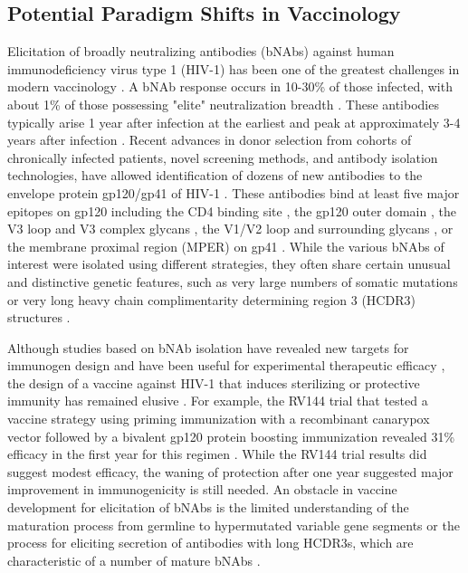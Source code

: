 \subsection{Potential Paradigm Shifts in Vaccinology}
Elicitation of broadly neutralizing antibodies (bNAbs) against human immunodeficiency virus type 1 (HIV-1) has been one of the greatest challenges in modern vaccinology \citep{Ackerman:2013fc}. A bNAb response occurs in 10-30\% of those infected, with about 1\% of those possessing "elite" neutralization breadth \citep{Simek:2009cn}. These antibodies typically arise 1 year after infection at the earliest and peak at approximately 3-4 years after infection \citep{vanGils:2009if}. Recent advances in donor selection from cohorts of chronically infected patients, novel screening methods, and antibody isolation technologies, have allowed identification of dozens of new antibodies to the envelope protein gp120/gp41 of HIV-1 \citep{Kwong:2012cc}. These antibodies bind at least five major epitopes on gp120 including the CD4 binding site \citep{Wu:2011jf}, the gp120 outer domain \citep{Trkola:1996vb},  the V3 loop and V3 complex glycans \citep{Mouquet:2012ka}, the V1/V2 loop and surrounding glycans \citep{Walker:2009cd}, or the membrane proximal region (MPER) on gp41 \citep{Huang:2012fh}. While the various bNAbs of interest were isolated using different strategies, they often share certain unusual and distinctive genetic features, such as very large numbers of somatic mutations or very long heavy chain complimentarity determining region 3 (HCDR3) structures \citep{Corti:2013ex}.

Although studies based on bNAb isolation have revealed new targets for immunogen design and have been useful for experimental therapeutic efficacy \citep{Klein:2012gi}, the design of a vaccine against HIV-1 that induces sterilizing or protective immunity has remained elusive \citep{McCoy:2013jq}. For example, the RV144 trial that tested a vaccine strategy using priming immunization with a recombinant canarypox vector followed by a bivalent gp120 protein boosting immunization revealed 31\% efficacy in the first year for this regimen \citep{RerksNgarm:2009bk}. While the RV144 trial results did suggest modest efficacy, the waning of protection after one year suggested major improvement in immunogenicity is still needed. An obstacle in vaccine development for elicitation of bNAbs is the limited understanding of the maturation process from germline to hypermutated variable gene segments or the process for eliciting secretion of antibodies with long HCDR3s, which are characteristic of a number of mature bNAbs \citep{Haynes:2012ba}.

